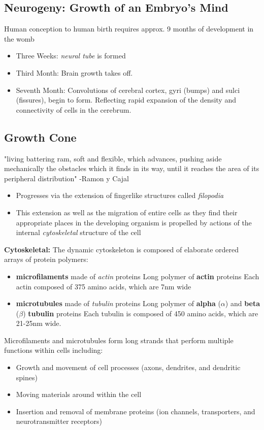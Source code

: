 \documentclass{article}
\begin{document}
\subsection{Neurogeny: Growth of an Embryo's Mind}
Human conception to human birth requires approx. 9 months of development in the womb 
\begin{itemize}
    \item Three Weeks: \textit{neural tube} is formed
    \item Third Month: Brain growth takes off. 
    \item Seventh Month: Convolutions of cerebral cortex, gyri (bumps) and sulci (fissures), begin to form. Reflecting rapid expansion of the density and connectivity of cells in the cerebrum. 
\end{itemize}

\subsection{Growth Cone}
"living battering ram, soft and flexible, which advances, pushing aside mechanically the obstacles which it finds in its way, until it reaches the area of its peripheral distribution" -Ramon y Cajal 
\begin{itemize}
    \item Progresses via the extension of fingerlike structures called \textit{filopodia}
    \item This extension as well as the migration of entire cells as they find their appropriate places in the developing organism is propelled by actions of the internal \textit{cytoskeletal} structure of the cell
\end{itemize}
\textbf{Cytoskeletal:} The dynamic cytoskeleton is composed of elaborate ordered arrays of protein polymers: 
\begin{itemize}
    \item \textbf{microfilaments} made of \textit{actin} proteins
        \subitem Long polymer of \textbf{actin} proteins
        \subitem Each actin composed of 375 amino acids, which are 7nm wide
    \item \textbf{microtubules} made of \textit{tubulin} proteins 
        \subitem Long polymer of \textbf{alpha} ($\alpha$) and \textbf{beta} ($\beta$) \textbf{tubulin} proteins
        \subitem Each tubulin is composed of 450 amino acids, which are 21-25nm wide. 
\end{itemize}


\noindent Microfilaments and microtubules form long strands that perform multiple functions within cells including: 
\begin{itemize}
    \item Growth and movement of cell processes (axons, dendrites, and dendritic spines) 
    \item Moving materials around within the cell
    \item Insertion and removal of membrane proteins (ion channels, transporters, and neurotransmitter receptors)
\end{itemize}
\end{document}

